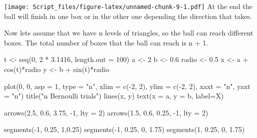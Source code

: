 \documentclass[
]{article}
\newenvironment{Shaded}{\begin{snugshade}}{\end{snugshade}}
\newcommand{\AttributeTok}[1]{\textcolor[rgb]{0.77,0.63,0.00}{#1}}
\newcommand{\DecValTok}[1]{\textcolor[rgb]{0.00,0.00,0.81}{#1}}
\newcommand{\FloatTok}[1]{\textcolor[rgb]{0.00,0.00,0.81}{#1}}
\newcommand{\FunctionTok}[1]{\textcolor[rgb]{0.00,0.00,0.00}{#1}}
\newcommand{\NormalTok}[1]{#1}
\newcommand{\OtherTok}[1]{\textcolor[rgb]{0.56,0.35,0.01}{#1}}
\newcommand{\SpecialCharTok}[1]{\textcolor[rgb]{0.00,0.00,0.00}{#1}}
\newcommand{\StringTok}[1]{\textcolor[rgb]{0.31,0.60,0.02}{#1}}
\begin{document}
\texttt{[image: Script\_files/figure-latex/unnamed-chunk-9-1.pdf]} At the
end the ball will finish in one box or in the other one depending the
direction that takes.

Now lets assume that we have n levels of triangles, so the ball can
reach different boxes. The total number of boxes that the ball can reach
is n + 1.

\begin{Shaded}
\begin{Highlighting}[]
\NormalTok{t }\OtherTok{\textless{}{-}} \FunctionTok{seq}\NormalTok{(}\DecValTok{0}\NormalTok{, }\DecValTok{2} \SpecialCharTok{*} \FloatTok{3.1416}\NormalTok{, }\AttributeTok{length.out =} \DecValTok{100}\NormalTok{)}
\NormalTok{a }\OtherTok{\textless{}{-}} \DecValTok{2} 
\NormalTok{b }\OtherTok{\textless{}{-}} \FloatTok{0.6}
\NormalTok{radio }\OtherTok{\textless{}{-}} \FloatTok{0.5}
\NormalTok{x }\OtherTok{\textless{}{-}}\NormalTok{ a }\SpecialCharTok{+} \FunctionTok{cos}\NormalTok{(t)}\SpecialCharTok{*}\NormalTok{radio}
\NormalTok{y }\OtherTok{\textless{}{-}}\NormalTok{ b }\SpecialCharTok{+} \FunctionTok{sin}\NormalTok{(t)}\SpecialCharTok{*}\NormalTok{radio}

\FunctionTok{plot}\NormalTok{(}\DecValTok{0}\NormalTok{, }\DecValTok{0}\NormalTok{, }\AttributeTok{asp =} \DecValTok{1}\NormalTok{, }\AttributeTok{type =} \StringTok{"n"}\NormalTok{, }\AttributeTok{xlim =} \FunctionTok{c}\NormalTok{(}\SpecialCharTok{{-}}\DecValTok{2}\NormalTok{, }\DecValTok{2}\NormalTok{), }\AttributeTok{ylim =} \FunctionTok{c}\NormalTok{(}\SpecialCharTok{{-}}\DecValTok{2}\NormalTok{, }\DecValTok{2}\NormalTok{), }\AttributeTok{xaxt =} \StringTok{"n"}\NormalTok{, }\AttributeTok{yaxt =} \StringTok{"n"}\NormalTok{)}
\FunctionTok{title}\NormalTok{(}\StringTok{"n Bernoulli trials"}\NormalTok{)}
\FunctionTok{lines}\NormalTok{(x, y)}
\FunctionTok{text}\NormalTok{(}\AttributeTok{x =}\NormalTok{ a, }\AttributeTok{y =}\NormalTok{ b, }\AttributeTok{label=}\StringTok{\textquotesingle{}X\textquotesingle{}}\NormalTok{)}

\FunctionTok{arrows}\NormalTok{(}\FloatTok{2.5}\NormalTok{, }\FloatTok{0.6}\NormalTok{, }\FloatTok{3.75}\NormalTok{, }\SpecialCharTok{{-}}\DecValTok{1}\NormalTok{, }\AttributeTok{lty =} \DecValTok{2}\NormalTok{)}
\FunctionTok{arrows}\NormalTok{(}\FloatTok{1.5}\NormalTok{, }\FloatTok{0.6}\NormalTok{, }\FloatTok{0.25}\NormalTok{, }\SpecialCharTok{{-}}\DecValTok{1}\NormalTok{, }\AttributeTok{lty =} \DecValTok{2}\NormalTok{)}

\FunctionTok{segments}\NormalTok{(}\SpecialCharTok{{-}}\DecValTok{1}\NormalTok{, }\FloatTok{0.25}\NormalTok{, }\DecValTok{1}\NormalTok{,}\FloatTok{0.25}\NormalTok{)}
\FunctionTok{segments}\NormalTok{(}\SpecialCharTok{{-}}\DecValTok{1}\NormalTok{, }\FloatTok{0.25}\NormalTok{, }\DecValTok{0}\NormalTok{, }\FloatTok{1.75}\NormalTok{)}
\FunctionTok{segments}\NormalTok{(}\DecValTok{1}\NormalTok{, }\FloatTok{0.25}\NormalTok{, }\DecValTok{0}\NormalTok{, }\FloatTok{1.75}\NormalTok{)}


\end{Highlighting}
\end{Shaded}
\end{document}
